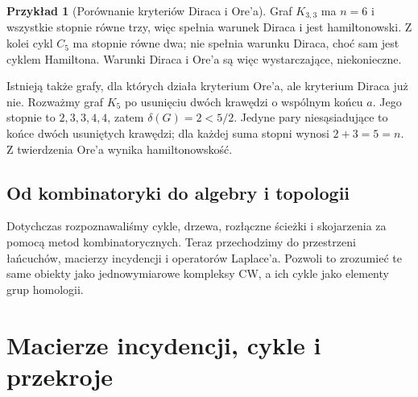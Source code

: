 \documentclass[11pt,a4paper]{report}
\numberwithin{equation}{section}
\theoremstyle{plain}
\theoremstyle{definition}
\newtheorem{przyklad}[twierdzenie]{Przykład}
\theoremstyle{remark}
\begin{document}
\begin{przyklad}[Porównanie kryteriów Diraca i Ore'a]
Graf $K_{3,3}$ ma $n=6$ i wszystkie stopnie równe trzy,
więc spełnia warunek Diraca i jest hamiltonowski.
Z kolei cykl $C_5$ ma stopnie równe dwa; nie spełnia
warunku Diraca, choć sam jest cyklem Hamiltona.
Warunki Diraca i Ore'a są więc wystarczające, niekonieczne.

Istnieją także grafy, dla których działa kryterium Ore'a,
ale kryterium Diraca już nie. Rozważmy graf $K_5$
po usunięciu dwóch krawędzi o wspólnym końcu $a$.
Jego stopnie to $2,3,3,4,4$, zatem
$\delta(G)=2<5/2$. Jedyne pary niesąsiadujące
to końce dwóch usuniętych krawędzi; dla każdej
suma stopni wynosi $2+3=5=n$.
Z twierdzenia Ore'a wynika hamiltonowskość.
\end{przyklad}

\begin{center}
\end{center}

\section*{Od kombinatoryki do algebry i topologii}

Dotychczas rozpoznawaliśmy cykle, drzewa, rozłączne ścieżki
i skojarzenia za pomocą metod kombinatorycznych. Teraz przechodzimy
do przestrzeni łańcuchów, macierzy incydencji i operatorów Laplace'a.
Pozwoli to zrozumieć te same obiekty jako jednowymiarowe kompleksy
CW, a ich cykle jako elementy grup homologii.



\chapter{Macierze incydencji, cykle i przekroje}
\label{ch:tg-algebra}
\end{document}
